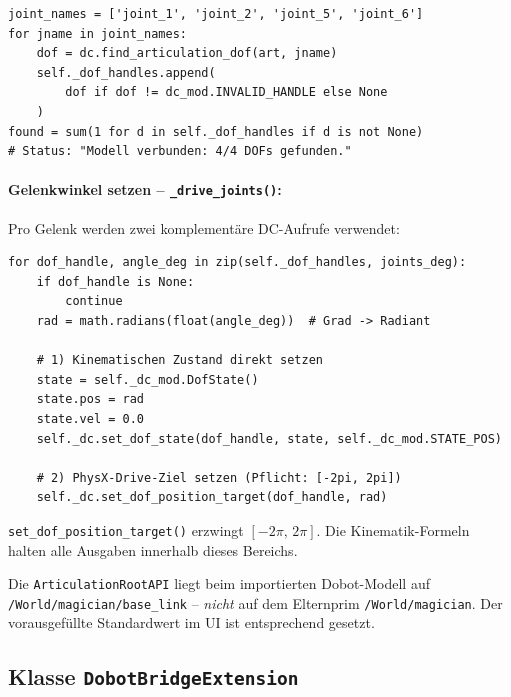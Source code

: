 \documentclass[11pt,a4paper]{article}
\begin{document}
\begin{lstlisting}[caption={DOF-Handle-Abruf in \_init\_articulation()}]
joint_names = ['joint_1', 'joint_2', 'joint_5', 'joint_6']
for jname in joint_names:
    dof = dc.find_articulation_dof(art, jname)
    self._dof_handles.append(
        dof if dof != dc_mod.INVALID_HANDLE else None
    )
found = sum(1 for d in self._dof_handles if d is not None)
# Status: "Modell verbunden: 4/4 DOFs gefunden."
\end{lstlisting}

\paragraph{Gelenkwinkel setzen -- \texttt{\_drive\_joints()}:}

Pro Gelenk werden zwei komplementäre DC-Aufrufe verwendet:

\begin{lstlisting}[caption={\_drive\_joints() -- doppelter DC-Aufruf}]
for dof_handle, angle_deg in zip(self._dof_handles, joints_deg):
    if dof_handle is None:
        continue
    rad = math.radians(float(angle_deg))  # Grad -> Radiant

    # 1) Kinematischen Zustand direkt setzen
    state = self._dc_mod.DofState()
    state.pos = rad
    state.vel = 0.0
    self._dc.set_dof_state(dof_handle, state, self._dc_mod.STATE_POS)

    # 2) PhysX-Drive-Ziel setzen (Pflicht: [-2pi, 2pi])
    self._dc.set_dof_position_target(dof_handle, rad)
\end{lstlisting}

\begin{warnbox}
\texttt{set\_dof\_position\_target()} erzwingt $[-2\pi,\, 2\pi]$.
Die Kinematik-Formeln halten alle Ausgaben innerhalb dieses Bereichs.
\end{warnbox}

\begin{notebox}
Die \texttt{ArticulationRootAPI} liegt beim importierten Dobot-Modell
auf \texttt{/World/magician/base\_link} -- \emph{nicht} auf dem
Elternprim \texttt{/World/magician}. Der vorausgefüllte Standardwert
im UI ist entsprechend gesetzt.
\end{notebox}

\subsection{Klasse \texttt{DobotBridgeExtension}}
\label{sec:extension}
\end{document}
